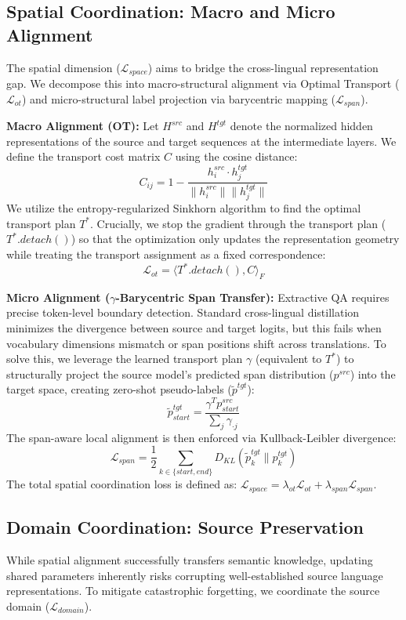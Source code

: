 \documentclass[11pt]{article}
\begin{document}
\subsection{Spatial Coordination: Macro and Micro Alignment}
The spatial dimension ($\mathcal{L}_{space}$) aims to bridge the cross-lingual representation gap. We decompose this into macro-structural alignment via Optimal Transport ($\mathcal{L}_{ot}$) and micro-structural label projection via barycentric mapping ($\mathcal{L}_{span}$).

\textbf{Macro Alignment (OT):} Let $H^{src}$ and $H^{tgt}$ denote the normalized hidden representations of the source and target sequences at the intermediate layers. We define the transport cost matrix $C$ using the cosine distance:
$$ C_{ij} = 1 - \frac{h^{src}_i \cdot h^{tgt}_j}{\|h^{src}_i\| \|h^{tgt}_j\|} $$
We utilize the entropy-regularized Sinkhorn algorithm to find the optimal transport plan $T^*$. Crucially, we stop the gradient through the transport plan ($T^*.detach()$) so that the optimization only updates the representation geometry while treating the transport assignment as a fixed correspondence:
$$ \mathcal{L}_{ot} = \langle T^*.detach(), C \rangle_F $$

\textbf{Micro Alignment ($\gamma$-Barycentric Span Transfer):} Extractive QA requires precise token-level boundary detection. Standard cross-lingual distillation minimizes the divergence between source and target logits, but this fails when vocabulary dimensions mismatch or span positions shift across translations. To solve this, we leverage the learned transport plan $\gamma$ (equivalent to $T^*$) to structurally project the source model's predicted span distribution ($p^{src}$) into the target space, creating zero-shot pseudo-labels ($\tilde{p}^{tgt}$):
$$ \tilde{p}^{tgt}_{start} = \frac{\gamma^T p^{src}_{start}}{\sum_j \gamma_{\cdot j}} $$
The span-aware local alignment is then enforced via Kullback-Leibler divergence:
$$ \mathcal{L}_{span} = \frac{1}{2} \sum_{k \in \{start, end\}} D_{KL}(\tilde{p}^{tgt}_{k} \| p^{tgt}_{k}) $$
The total spatial coordination loss is defined as: $\mathcal{L}_{space} = \lambda_{ot}\mathcal{L}_{ot} + \lambda_{span}\mathcal{L}_{span}$.

\subsection{Domain Coordination: Source Preservation}
\label{sec:domain}
While spatial alignment successfully transfers semantic knowledge, updating shared parameters inherently risks corrupting well-established source language representations. To mitigate catastrophic forgetting, we coordinate the source domain ($\mathcal{L}_{domain}$).
\end{document}
